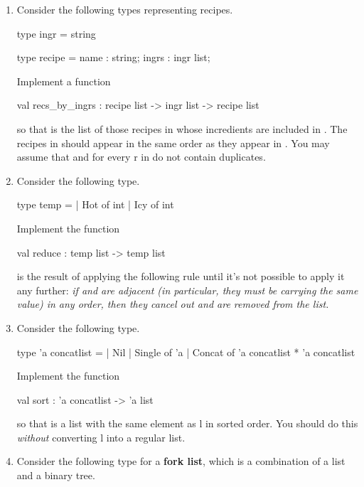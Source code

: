 \begin{enumerate}
\begin{ocaml}
    type int_or_string =
      | Int of int
      | String of string
  \end{ocaml}
  Implement the function
  \begin{ocaml}
    val convert : int_or_string list -> int_list_or_string_list list
  \end{ocaml}
  so that  is the result of grouping adjacent  values and  values, e.g.,
  \begin{ocaml}
    let test_in = [Int 2; Int 3; String "a"; String "b"; Int 4; String "c"]
    let test_out = [IntList [2;3]; StringList ["a";"b"]; IntList [4]; StringList ["c"]]
    let _ = assert (convert test_in = test_out)
  \end{ocaml}
\item
  Consider the following types representing recipes.
  \begin{ocaml}
    type ingr = string

    type recipe = {
      name : string;
      ingrs : ingr list;
    }
  \end{ocaml}
  Implement a function
  \begin{ocaml}
    val recs_by_ingrs : recipe list -> ingr list -> recipe list
  \end{ocaml}
  so that  is the list of those recipes in  whose incredients are included in .
  The recipes in  should appear in the same order as they appear in .
  You may assume that  and  for every \codel r in  do not contain duplicates.
\item
  Consider the following type.
  \begin{ocaml}
    type temp =
      | Hot of int
      | Icy of int
  \end{ocaml}
  Implement the function
  \begin{ocaml}
    val reduce : temp list -> temp list
  \end{ocaml}
   is the result of applying the following rule until it's not possible to apply it any further: \textit{if \textnormal{} and \textnormal{} are adjacent (in particular, they must be carrying the same value) in any order, then they cancel out and are removed from the list.}
\item
  Consider the following type.
  \begin{ocaml}
    type 'a concatlist =
      | Nil
      | Single of 'a
      | Concat of 'a concatlist * 'a concatlist
  \end{ocaml}
  Implement the function
  \begin{ocaml}
    val sort : 'a concatlist -> 'a list
  \end{ocaml}
  so that  is a list with the same element as \codel l in sorted order.
  You should do this \textit{without} converting \codel l into a regular list.
\item
  Consider the following type for a \textbf{fork list}, which is a combination of a list and a binary tree.


\end{enumerate}
